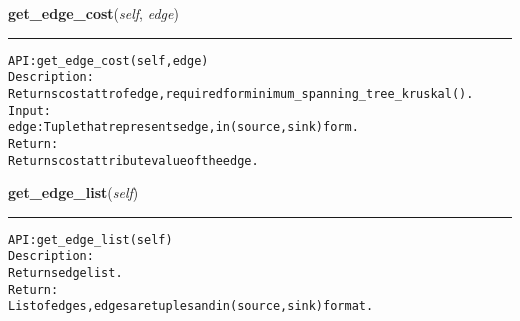     \label{coinor:gimpy:graph:Graph:get_edge_cost}

    \vspace{0.5ex}

\hspace{.8\funcindent}\begin{boxedminipage}{\funcwidth}

    \raggedright \textbf{get\_edge\_cost}(\textit{self}, \textit{edge})

    \vspace{-1.5ex}

    \rule{\textwidth}{0.5\fboxrule}
\setlength{\parskip}{2ex}
\begin{alltt}

API: get\_edge\_cost(self, edge)
Description:
Returns cost attr of edge, required for minimum\_spanning\_tree\_kruskal().
Input:
    edge: Tuple that represents edge, in (source,sink) form.
Return:
    Returns cost attribute value of the edge.
\end{alltt}

\setlength{\parskip}{1ex}
    \end{boxedminipage}

    \label{coinor:gimpy:graph:Graph:get_edge_list}

    \vspace{0.5ex}

\hspace{.8\funcindent}\begin{boxedminipage}{\funcwidth}

    \raggedright \textbf{get\_edge\_list}(\textit{self})

    \vspace{-1.5ex}

    \rule{\textwidth}{0.5\fboxrule}
\setlength{\parskip}{2ex}
\begin{alltt}

API: get\_edge\_list(self)
Description:
Returns edge list.
Return:
    List of edges, edges are tuples and in (source,sink) format.
\end{alltt}

\setlength{\parskip}{1ex}
    \end{boxedminipage}

